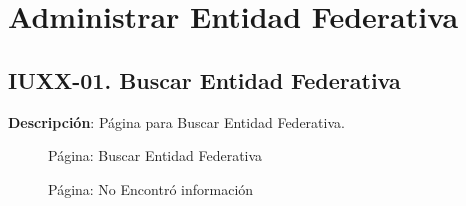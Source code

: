 \begin{table}[H]
	\caption{Forma: Eliminar Moneda}
	\label{tab:ui-delete-moneda-form}
\end{table}



\clearpage
\section{Administrar Entidad Federativa} \label{sec:cf-ui-admin-entidadfederativa}

\subsection{IUXX-01. Buscar Entidad Federativa} \label{sec:ui-page-search-entidadfederativa}

\textbf{Descripción}: Página para Buscar Entidad Federativa.\\

\begin{figure}[H]
	\label{tab:ui-search-entidadfederativa-page}
	\caption{Página: Buscar Entidad Federativa}
\end{figure}

\begin{figure}[H]
	\label{tab:ui-nosearch-entidadfederativa-page}
	\caption{Página: No Encontró información}
\end{figure}

